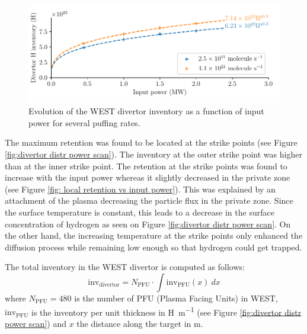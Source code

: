 \begin{figure}
    \centering
    \includegraphics[width=\linewidth]{Figures/divertor/WEST/inventory_vs_input_power.pdf}
    \caption{Evolution of the WEST divertor inventory as a function of input power for several puffing rates.}
    \label{fig:inventory vs input power}
\end{figure}


The maximum retention was found to be located at the strike points (see Figure \ref{fig:divertor distr power scan}).
The inventory at the outer strike point was higher than at the inner strike point.
The retention at the strike points was found to increase with the input power whereas it slightly decreased in the private zone (see Figure \ref{fig: local retention vs input power}).
This was explained by an attachment of the plasma decreasing the particle flux in the private zone.
Since the surface temperature is constant, this leads to a decrease in the surface concentration of hydrogen as seen on Figure \ref{fig:divertor distr power scan}.
On the other hand, the increasing temperature at the strike points only enhanced the diffusion process while remaining low enough so that hydrogen could get trapped.

The total inventory in the WEST divertor is computed as follows:
\begin{equation}
    \mathrm{inv}_\mathrm{divertor} = N_\mathrm{PFU} \cdot \int \mathrm{inv}_\mathrm{PFU}(x)\: dx
    \label{eq: inventory WEST}
\end{equation}
where $N_\mathrm{PFU} = 480$ is the number of PFU (Plasma Facing Units) in WEST, $\mathrm{inv}_\mathrm{PFU}$ is the inventory per unit thickness in \si{H.m^{-1}} (see Figure \ref{fig:divertor distr power scan}) and $x$ the distance along the target in \si{m}.

